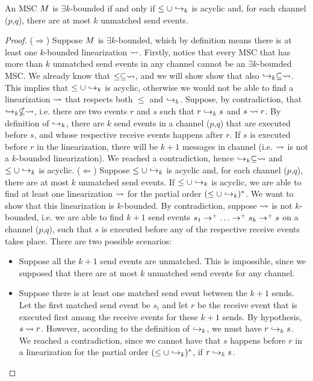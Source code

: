 \begin{proposition}\label{prop:asy_ek_def_alt}
	An MSC $M$ is $\exists k$-bounded if and only if $\le \cup \hookrightarrow_{k}$ is acyclic and, for each channel ($p$,$q$), there are at most $k$ unmatched send events.
\end{proposition}
\begin{proof}
	($\Rightarrow$) Suppose $M$ is $\exists k$-bounded, which by definition means there is at least one $k$-bounded linearization $\rightsquigarrow$. Firstly, notice that every MSC that has more than $k$ unmatched send events in any channel cannot be an $\exists k$-bounded MSC. We already know that $\le \subseteq \rightsquigarrow$, and we will show show that also $\hookrightarrow_{k} \subseteq \rightsquigarrow$. This implies that $\le \cup \hookrightarrow_{k}$ is acyclic, otherwise we would not be able to find a linearization $\rightsquigarrow$ that respects both $\le$ and $\hookrightarrow_{k}$. Suppose, by contradiction, that $\hookrightarrow_{k} \nsubseteq \rightsquigarrow$, i.e. there are two events $r$ and $s$ such that $r \hookrightarrow_{k} s$ and $s \rightsquigarrow r$. By definition of $\hookrightarrow_{k}$, there are $k$ send events in a channel ($p$,$q$) that are executed before $s$, and whose respective receive events happens after $r$. If $s$ is executed before $r$ in the linearization, there will be $k+1$ messages in channel (i.e. $\rightsquigarrow$ is not a $k$-bounded linearization). We reached a contradiction, hence $\hookrightarrow_{k} \subseteq \rightsquigarrow$ and $\le \cup \hookrightarrow_{k}$ is acyclic.\newline
	($\Leftarrow$) Suppose $\le \cup \hookrightarrow_{k}$ is acyclic and, for each channel ($p$,$q$), there are at most $k$ unmatched send events. If $\le \cup \hookrightarrow_{k}$ is acyclic, we are able to find at least one linearization $\rightsquigarrow$ for the partial order $(\le \cup \hookrightarrow_{k})^\ast$. We want to show that this linearization is $k$-bounded. By contradiction, suppose $\rightsquigarrow$ is not $k$-bounded, i.e. we are able to find $k+1$ send events $s_1 \procrel^+ \dots \procrel^+ s_k \procrel^+ s$ on a channel ($p$,$q$), such that $s$ is executed before any of the respective receive events takes place. There are two possible scenarios:
	\begin{itemize}\itemsep=0.5ex
		\item Suppose all the $k+1$ send events are unmatched. This is impossible, since we supposed that there are at most $k$ unmatched send events for any channel.
		\item Suppose there is at least one matched send event between the $k+1$ sends. Let the first matched send event be $s_i$ and let $r$ be the receive event that is executed first among the receive events for these $k+1$ sends. By hypothesis, $s \rightsquigarrow r$. However, according to the definition of $\hookrightarrow_{k}$, we must have $r \hookrightarrow_{k} s$. We reached a contradiction, since we cannot have that $s$ happens before $r$ in a linearization for the partial order $(\le \cup \hookrightarrow_{k})^\ast$, if $r \hookrightarrow_{k} s$.
	\end{itemize}
\end{proof}

